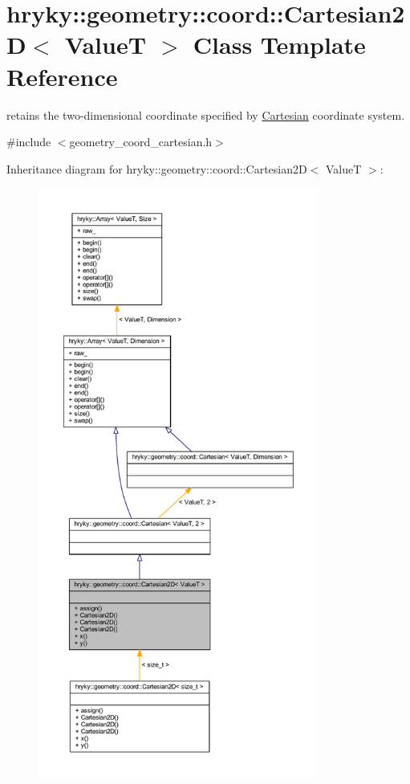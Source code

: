 \hypertarget{classhryky_1_1geometry_1_1coord_1_1_cartesian2_d}{\section{hryky\-:\-:geometry\-:\-:coord\-:\-:Cartesian2\-D$<$ Value\-T $>$ Class Template Reference}
\label{classhryky_1_1geometry_1_1coord_1_1_cartesian2_d}
}


retains the two-\/dimensional coordinate specified by \hyperlink{classhryky_1_1geometry_1_1coord_1_1_cartesian}{Cartesian} coordinate system.  




{\ttfamily \#include $<$geometry\-\_\-coord\-\_\-cartesian.\-h$>$}



Inheritance diagram for hryky\-:\-:geometry\-:\-:coord\-:\-:Cartesian2\-D$<$ Value\-T $>$\-:
\nopagebreak
\begin{figure}[H]
\begin{center}
\leavevmode
\includegraphics[height=550pt]{classhryky_1_1geometry_1_1coord_1_1_cartesian2_d__inherit__graph}
\end{center}
\end{figure}
